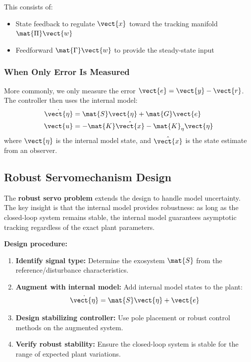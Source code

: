 This consists of:
\begin{itemize}
    \item State feedback to regulate $\vect{x}$ toward the tracking manifold $\mat{\Pi}\vect{w}$
    \item Feedforward $\mat{\Gamma}\vect{w}$ to provide the steady-state input
\end{itemize}

\subsubsection{When Only Error Is Measured}

More commonly, we only measure the error $\vect{e} = \vect{y} - \vect{r}$. The controller then uses the internal model:
\begin{align}
\dot{\vect{\eta}} &= \mat{S}\vect{\eta} + \mat{G}\vect{e} \\
\vect{u} &= -\mat{K}\hat{\vect{x}} - \mat{K}_\eta\vect{\eta}
\label{eq:servo_internal_model}
\end{align}
where $\vect{\eta}$ is the internal model state, and $\hat{\vect{x}}$ is the state estimate from an observer.

\subsection{Robust Servomechanism Design}

The \textbf{robust servo problem} extends the design to handle model uncertainty. The key insight is that the internal model provides robustness: as long as the closed-loop system remains stable, the internal model guarantees asymptotic tracking regardless of the exact plant parameters.

\textbf{Design procedure:}

\begin{enumerate}
    \item \textbf{Identify signal type:} Determine the exosystem $\mat{S}$ from the reference/disturbance characteristics.

    \item \textbf{Augment with internal model:} Add internal model states to the plant:
    \begin{equation}
    \dot{\vect{\eta}} = \mat{S}\vect{\eta} + \vect{e}
    \end{equation}

    \item \textbf{Design stabilizing controller:} Use pole placement or robust control methods on the augmented system.

    \item \textbf{Verify robust stability:} Ensure the closed-loop system is stable for the range of expected plant variations.
\end{enumerate}

